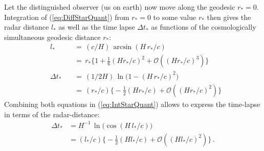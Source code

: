 \documentclass
[rmp,aps,twocolumn,showpacs,preprintnumbers,amsmath,amssymb]{revtex4}
\theoremstyle{plain}
\theoremstyle{definition}
\theoremstyle{remark}
\newcommand{\Ord}{\mathcal{O}}                %
\begin{document}
Let the distinguished observer (us on earth) now move along the 
geodesic $r_*=0$. Integration of (\ref{eq:DiffStarQuant}) from $r_*=0$
to some value $r_*$ then gives the radar distance $l_*$ as well as 
the time lapse $\Delta t_*$ as functions of the cosmologically 
simultaneous geodesic distance $r_*$: 
%
\begin{subequations}\label{eq:IntStarQuant}
\begin{alignat}{2}
  & l_*&&\,=\,(c/H)\,\arcsin(H\,r_*/c)\nonumber\\
\label{eq:IntRadDist}
  &    &&\,=\, r_*\bigl\{1+\tfrac{1}{6}(Hr_*/c)^2 
         + \Ord\left((Hr_*/c)^3\right)\bigr\}\\
  & \Delta t_*&&\,=\,(1/2H)\,\ln\bigl(1-(H\,r_*/c)^2\bigr)\nonumber\\
\label{eq:IntLapseEinstSim1}
  &  &&\,=\, (r_*/c)\bigl\{-\tfrac{1}{2}(Hr_*/c) 
         + \Ord\left((Hr_*/c)^2\right)\bigr\}
\end{alignat}
\end{subequations}
%
Combining both equations in (\ref{eq:IntStarQuant}) allows to 
express the time-lapse in terms of the radar-distance: 
%
\begin{equation}
\begin{split}\label{eq:IntLapseEinstSim2}
  \Delta t_* &=H^{-1}\,\ln\bigl(\cos(H\,l_*/c)\bigr)\\
  &=(l_*/c)\bigl\{-\tfrac{1}{2}(Hl_*/c) + \Ord\left((Hl_*/c)^2\right)\bigr\}\,.\\
\end{split}
\end{equation}
%
\end{document}
